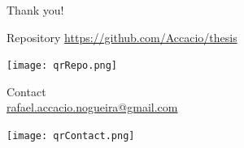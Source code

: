 \documentclass[aspectratio=169]{beamer}
\begin{document}
\begin{frame}[plain]
  \centering
  \vfill
  Thank you!
  \vfill
  \begin{minipage}[t]{.45\linewidth}
    \small
    \centering
    Repository
    \href{https://github.com/Accacio/thesis}{https://github.com/Accacio/thesis}

    \texttt{[image: qrRepo.png]}
  \end{minipage}
  \hfill
  \begin{minipage}[t]{.5\linewidth}
    \small
    \centering
    Contact\\
    \href{mailto:rafael.accacio.nogueira@gmail.com?subject=Thesis Defense Presentation}{rafael.accacio.nogueira@gmail.com}

    \texttt{[image: qrContact.png]}
  \end{minipage}
  \fi

\end{frame}
\end{document}
